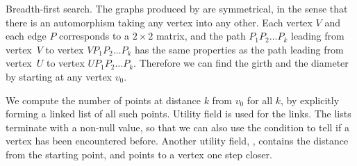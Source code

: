 Breadth-first search. The graphs produced by  are
symmetrical, in
the sense that there is an automorphism taking any vertex into any
other. Each vertex $V$ and each edge $P$ corresponds to a $2\times2$
matrix, and the path $P_1P_2\ldots P_k$ leading from vertex~$V$ to
vertex $VP_1P_2\ldots P_k$ has the same properties as the path leading
from vertex~$U$ to vertex $UP_1P_2\ldots P_k$. Therefore we can find
the girth and the diameter by starting at any vertex $v_0$.

We compute the number of points at distance $k$ from $v_0$ for
all $k$, by explicitly forming a linked list of all such points.
Utility field  is used for the links. The lists
terminate with a non-null  value, so that we can also
use the condition  to tell if a vertex has been
encountered before. Another utility field, , contains the
distance from the starting point, and  points to a
vertex one step closer.

